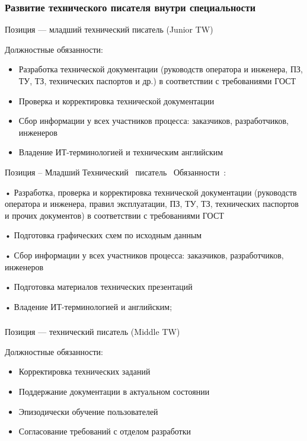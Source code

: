 \documentclass{../industrial-development}
\begin{document}
\begin{frame} \frametitle{Развитие технического писателя внутри специальности}
  \begin{block}{}
  \alert{Позиция --- младший технический писатель (Junior TW) }

Должностные обязанности: 
  \end{block}
  \begin{itemize}
  \item  Разработка технической документации (руководств оператора и инженера, ПЗ, ТУ, ТЗ, технических паспортов и др.) в соответствии с требованиями  ГОСТ
  \item  Проверка и корректировка технической документации
  \item Сбор информации у всех участников процесса: заказчиков, разработчиков, инженеров
 \item Владение ИТ-терминологией и техническим английским
  \end{itemize}
\end{frame}


\lecturenotes

Позиция – Младший Технический~\cite{hh} писатель~\cite{itcf}
Обязанности~\cite{rab}:

•	Разработка, проверка и корректировка технической документации (руководств оператора и инженера, правил эксплуатации, ПЗ, ТУ, ТЗ, технических паспортов и прочих документов) в соответствии с требованиями ГОСТ 

•	Подготовка графических схем по исходным данным

•	Сбор информации у всех участников процесса: заказчиков, разработчиков, инженеров

•	Подготовка материалов технических презентаций

•	Владение ИТ-терминологией и английским;

\begin{frame} \frametitle{}
  \begin{block}{}
  \alert{Позиция --- технический писатель (Middle TW) }

Должностные обязанности: 
  \end{block}
  \begin{itemize}
  \item Корректировка технических заданий
  \item  Поддержание документации в актуальном состоянии
  \item Эпизодически обучение пользователей
 \item 	Согласование требований с отделом разработки
  \end{itemize}
\end{frame}
\end{document}
